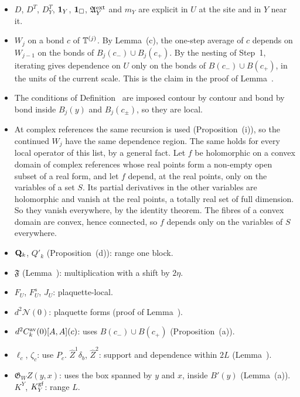 \begin{detail}
\begin{step}[(b) Constants]
\end{step}
\begin{step}
\begin{itemize}
\item $D$, $D^T$, $D^T_Y$, $\mathbf 1_Y$, $\mathbf 1_\Box$, $\mathfrak A^{\rm ext}_Y$ and $m_Y$ are explicit in $U$ at the site and in $Y$ near it.
\item $W_j$ on a bond $c$ of $\mathbb T^{(j)}$. By Lemma~(c), the one-step average of $c$ depends on $W_{j-1}$ on the bonds of $B_j(c_-)\cup B_j(c_+)$. By the nesting of Step~1, iterating gives dependence on $U$ only on the bonds of $B(c_-)\cup B(c_+)$, in the units of the current scale. This is the claim in the proof of Lemma~.
\item The conditions of Definition~ are imposed contour by contour and bond by bond inside $B_j(y)$ and $B_j(c_\pm)$, so they are local.
\item At complex references the same recursion is used (Proposition~(i)), so the continued $W_j$ have the same dependence region. The same holds for every local operator of this list, by a general fact. Let $f$ be holomorphic on a convex domain of complex references whose real points form a non-empty open subset of a real form, and let $f$ depend, at the real points, only on the variables of a set $S$. Its partial derivatives in the other variables are holomorphic and vanish at the real points, a totally real set of full dimension. So they vanish everywhere, by the identity theorem. The fibres of a convex domain are convex, hence connected, so $f$ depends only on the variables of $S$ everywhere.
\item $\mathbf Q_k$, $Q'_k$ (Proposition~(d)): range one block.
\item $\mathfrak F$ (Lemma~): multiplication with a shift by $2\eta$.
\item $F_U$, $F^s_U$, $J_U$: plaquette-local.
\item $d^2\mathcal N(0)$: plaquette forms (proof of Lemma~).
\item $d^2C^{\rm av}_k(0)[A,A](c)$: uses $B(c_-)\cup B(c_+)$ (Proposition~(a)).
\item $\ell_c$, $\zeta_c$: use $P_c$. $\hat Z^1\delta_b$, $\hat Z^2$: support and dependence within $2L$ (Lemma~).
\item $\mathfrak G_WZ(y,x)$: uses the box spanned by $y$ and $x$, inside $B'(y)$ (Lemma~(a)). $K^Y$, $K^{\rm gf}_Y$: range $L$.

\end{itemize}
\end{step}
\end{detail}
